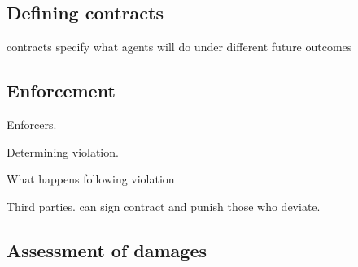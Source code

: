 
\subsection{Defining contracts}
contracts specify what agents will do under different future outcomes

\subsection{Enforcement}
Enforcers.

Determining violation.

What happens following violation

Third parties. can sign contract and punish those who deviate.

\subsection{Assessment of damages}

